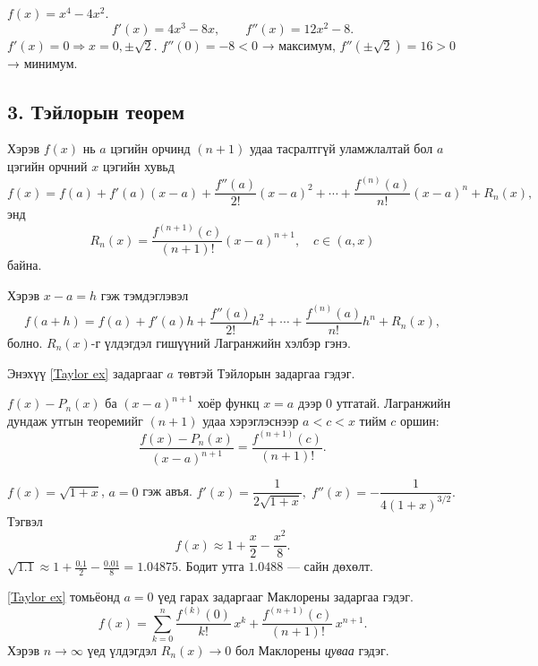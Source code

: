 \begin{example}
$f(x)=x^4-4x^2$.
\[
f'(x)=4x^3-8x,\qquad f''(x)=12x^2-8.
\]
$f'(x)=0\Rightarrow x=0,\pm\sqrt2$.  
$f''(0)=-8<0$ → максимум,  
$f''(\pm\sqrt2)=16>0$ → минимум.
\end{example}

\begin{center}
\end{center}

\subsection*{3. Тэйлорын теорем}

\begin{theorem}[Тэйлор]
Хэрэв $f(x)$ нь $a$ цэгийн орчинд $(n+1)$ удаа тасралтгүй уламжлалтай бол $a$ цэгийн орчний $x$ цэгийн хувьд
\begin{equation}\label{Taylor ex}
    f(x)=f(a)+f'(a)(x-a)+\frac{f''(a)}{2!}(x-a)^2+\cdots+\frac{f^{(n)}(a)}{n!}(x-a)^n+R_n(x),
\end{equation}
энд 
\[
R_n(x)=\frac{f^{(n+1)}(c)}{(n+1)!}(x-a)^{n+1},\quad c\in(a,x)
\] байна. 

Хэрэв $x-a=h$ гэж тэмдэглэвэл \[
f(a+h)=f(a)+f'(a)h+\frac{f''(a)}{2!}h^2+\cdots+\frac{f^{(n)}(a)}{n!}h^n+R_n(x),
\] болно. $R_n(x)$-г үлдэгдэл гишүүний Лагранжийн хэлбэр гэнэ.

Энэхүү \ref{Taylor ex} задаргааг $a$ төвтэй Тэйлорын задаргаа гэдэг. 
\end{theorem}

\begin{prof}
$f(x)-P_n(x)$ ба $(x-a)^{n+1}$ хоёр функц $x=a$ дээр 0 утгатай.  
Лагранжийн дундаж утгын теоремийг $(n+1)$ удаа хэрэглэснээр
$a<c<x$ тийм $c$ оршин:
\[
\frac{f(x)-P_n(x)}{(x-a)^{n+1}}=\frac{f^{(n+1)}(c)}{(n+1)!}.
\]
\end{prof}

\begin{example}
$f(x)=\sqrt{1+x}$, $a=0$ гэж авъя.  
$f'(x)=\dfrac1{2\sqrt{1+x}},\;
f''(x)=-\dfrac1{4(1+x)^{3/2}}.$  
Тэгвэл
\[
f(x)\approx1+\frac{x}{2}-\frac{x^2}{8}.
\]
$\sqrt{1.1}\approx1+\frac{0.1}{2}-\frac{0.01}{8}=1.04875.$  
Бодит утга $1.0488$ — сайн дөхөлт.
\end{example}
\begin{remark}
\ref{Taylor ex} томьёонд $a=0$ үед гарах задаргааг Маклорены задаргаа гэдэг. 
\[
f(x)=\sum_{k=0}^{n}\frac{f^{(k)}(0)}{k!}\,x^k+ \frac{f^{(n+1)}(c)}{(n+1)!}\,x^{n+1}.
\]
Хэрэв $n\to\infty$ үед үлдэгдэл $R_{n}(x)\to 0$ бол Маклорены \emph{цуваа} гэдэг.
\end{remark}

